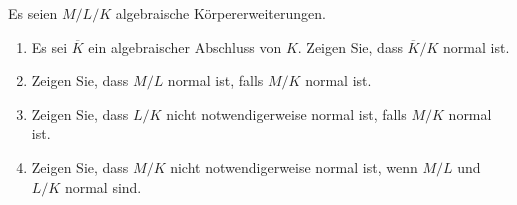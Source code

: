 \begin{question}[subtitle = Einschränkung und Transitivität von Normalität]
  \label{question: restriction and transitivity of normality}
  Es seien $M/L/K$ algebraische Körpererweiterungen.
  \begin{enumerate}
    \item
      Es sei $\overline{K}$ ein algebraischer Abschluss von $K$.
      Zeigen Sie, dass $\overline{K}/K$ normal ist.
    \item
      Zeigen Sie, dass $M/L$ normal ist, falls $M/K$ normal ist.
    \item
      Zeigen Sie, dass $L/K$ nicht notwendigerweise normal ist, falls $M/K$ normal ist.
    \item
      Zeigen Sie, dass $M/K$ nicht notwendigerweise normal ist, wenn $M/L$ und $L/K$ normal sind.
  \end{enumerate}
\end{question}


